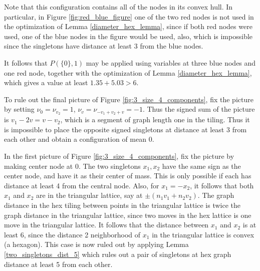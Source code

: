 \documentclass[a4paper, 12pt, notitlepage]{amsart}
\theoremstyle{remark}
\begin{document}
 
Note that this configuration contains all of the nodes in its convex hull.  In particular, in Figure \ref{fig:red_blue_figure} one of the two red nodes is not used in the optimization of Lemma \ref{diameter_hex_lemma}, since if both red nodes were used, one of the blue nodes in the figure would be used, also, which is impossible since the singletons have distance at least 3 from the blue nodes.


 

 It follows that $P(\{0\},1)$ may be applied using variables at three blue nodes and one red node,  together with the optimization of Lemma \ref{diameter_hex_lemma}, which gives a value at least $1.35 + 5.03 > 6$.  
 
 To rule out the final picture of Figure \ref{fig:3_size_4_components}, fix the picture by setting $\nu_0 = \nu_{v_2} = 1$, $\nu_v = \nu_{-v_1 + v_2 + v} =-1$.
  Thus the signed sum of the picture is $v_1-2v = v-v_2$, which is a segment of graph length one in the tiling.  Thus it is impossible to place the opposite signed singletons at distance at least 3 from each other and obtain a configuration of mean 0.
 
 
 In the first picture of Figure \ref{fig:3_size_4_components}, fix the picture by making center node at 0.  The two singletons $x_1, x_2$ have the same sign as the center node, and have it as their center of mass. This is only possible if each has distance at least 4 from the central node. Also, for $x_1 = -x_2$, it follows that both $x_1$ and $x_2$ are in the triangular lattice, say at $\pm(n_1v_1 + n_2 v_2)$.  The graph distance in the hex tiling between points in the triangular lattice is twice the graph distance in the triangular lattice, since two moves in the hex lattice is one move in the triangular lattice.  It follows that the distance between $x_1$ and $x_2$ is at least 6, since the distance 2 neighborhood of $x_1$ in the triangular lattice is convex (a hexagon).    This case is now ruled out by applying  Lemma \ref{two_singletons_dist_5} which rules out a pair of singletons at hex graph distance at least 5 from each other.  
 
  
 
\end{document}
